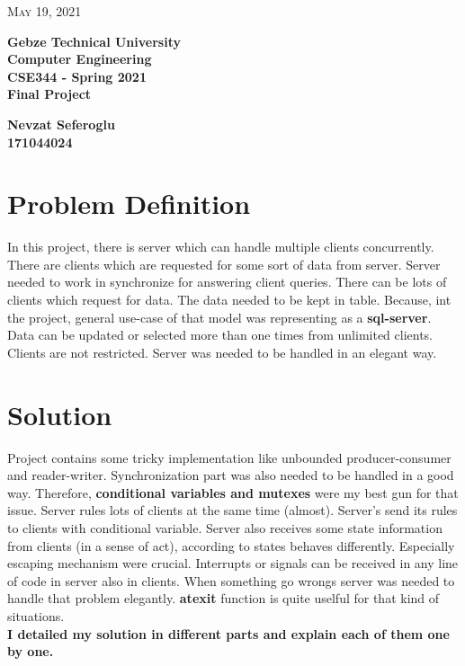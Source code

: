 \documentclass{article}
\begin{document}
\begin{titlepage}

	\begin{flushright}
	\textsc{\large May 19, 2021} \\
	\end{flushright}
	\begin{center}
	\Large{\bfseries Gebze Technical University \\ Computer Engineering \\ CSE344 - Spring 2021 \\ Final Project} \\
	\end{center}
	\vspace*{\fill}
	\begin{center}
	\Large{\bfseries Nevzat Seferoglu \\ 171044024 }
	\end{center}
	\vspace*{\fill}
\end{titlepage}

\cleardoublepage

\section{Problem Definition}
In this project, there is server which can handle multiple clients concurrently. There are clients which are requested for some sort of data from server. Server needed to work in synchronize for answering client queries. There can be lots of clients which request for data. The data needed to be kept in table. Because, int the project, general use-case of that model was representing as a \textbf{sql-server}. Data can be updated or selected more than one times from unlimited clients. Clients are not restricted. Server was needed to be handled in an elegant way.

\section{Solution}
Project contains some tricky implementation like unbounded producer-consumer and reader-writer. Synchronization part was also needed to be handled in a good way. Therefore, \textbf{conditional variables and mutexes} were my best gun for that issue. Server rules lots of clients at the same time (almost). Server's send its rules to clients with conditional variable. Server also receives some state information from clients (in a sense of act), according to states behaves differently. Especially escaping mechanism were crucial. Interrupts or signals can be received in any line of code in server also in clients. When something go wrongs server was needed to handle that problem elegantly. \textbf{atexit} function is quite uselful for that kind of situations.\\
\textbf{I detailed my solution in different parts and explain each of them one by one.}
\end{document}

